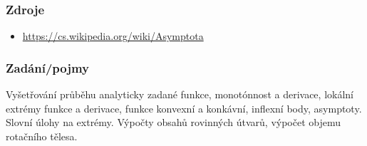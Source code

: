 \documentclass[12pt]{article}
\begin{document}
\subsubsection{Zdroje}
\begin{itemize}
\item \url{https://cs.wikipedia.org/wiki/Asymptota}
\end{itemize}
\subsubsection{Zadání/pojmy}
Vyšetřování průběhu analyticky zadané funkce, monotónnost a derivace, lokální extrémy funkce a derivace, funkce konvexní a konkávní, inflexní body, asymptoty. Slovní úlohy na extrémy. Výpočty obsahů rovinných útvarů, výpočet objemu rotačního tělesa.

\tableofcontents
\end{document}
